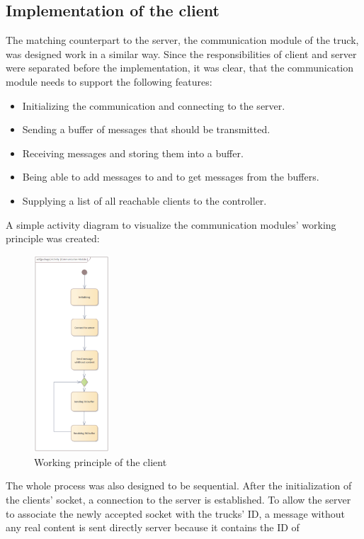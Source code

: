 \subsection{Implementation of the client}
The matching counterpart to the server, the communication module of the truck, was designed work in a
similar way. Since the responsibilities of client and server were separated before the implementation,
it was clear, that the communication module needs to support the following features:
\begin{itemize}
    \item Initializing the communication and connecting to the server.
    \item Sending a buffer of messages that should be transmitted.
    \item Receiving messages and storing them into a buffer.
    \item Being able to add messages to and to get messages from the buffers.
    \item Supplying a list of all reachable clients to the controller.
\end{itemize}
A simple activity diagram to visualize the communication modules’ working
principle was created:
\begin{figure}[ht]
    \centering
    \includegraphics[width=0.25\textwidth]{images/comms_client_act.png}
    \caption{Working principle of the client}
    \label{img:comms_client_principle}
\end{figure}
The whole process was also designed to be sequential. After the initialization of the clients’ socket, a
connection to the server is established. To allow the server to associate the newly accepted socket with
the trucks’ ID, a message without any real content is sent directly server because it contains the ID of
